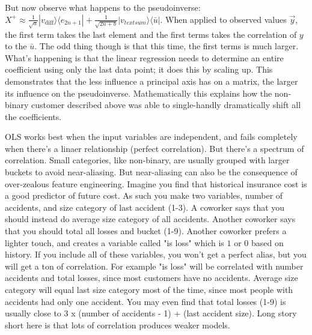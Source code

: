 \documentclass{amsbook}
\begin{document}
\begin{tcolorbox}[title=Example,colback=blue!5]
But now observe what happens to the pseudoinverse:  $X^+\approx\frac{1}{\sqrt{a}}|v_{\text{diff}}\rangle\langle e_{2n+1}|+\frac{1}{\sqrt{2n+b}}|v_{text{sum}}\rangle\langle\bar u|$.  When applied to observed values $\vec y$, the first term takes the last element and the first terms takes the correlation of $y$ to the $\bar u$.  The odd thing though is that this time, the first terms is much larger.  What's happening is that the linear regression needs to determine an entire coefficient using only the last data point; it does this by scaling up.  This demonstrates that the less influence a principal axis has on a matrix, the larger its influence on the pseudoinverse.  Mathematically this explains how the non-binary customer described above was able to single-handly dramatically shift all the coefficients.
\end{tcolorbox}

OLS works best when the input variables are independent, and fails completely when there's a linaer relationship (perfect correlation).  But there's a spectrum of correlation.  Small categories, like non-binary, are usually grouped with larger buckets to avoid near-aliasing.  But near-aliasing can also be the consequence of over-zealous feature engineering.  Imagine you find that historical insurance cost is a good predictor of future cost.  As such you make two variables, number of accidents, and size category of last accident (1-3).  A coworker says that you should instead do average size category of all accidents.  Another coworker says that you should total all losses and bucket (1-9).  Another coworker prefers a lighter touch, and creates a variable called "is loss" which is $1$ or $0$ based on history.  If you include all of these variables, you won't get a perfect alias, but you will get a ton of correlation.  For example "is loss" will be correlated with number accidents and total losses, since most customers have no accidents.  Average size category will equal last size category most of the time, since most people with accidents had only one accident.  You may even find that total losses (1-9) is usually close to 3 x (number of accidents - 1) + (last accident size).  Long story short here is that lots of correlation produces weaker models.
\end{document}
